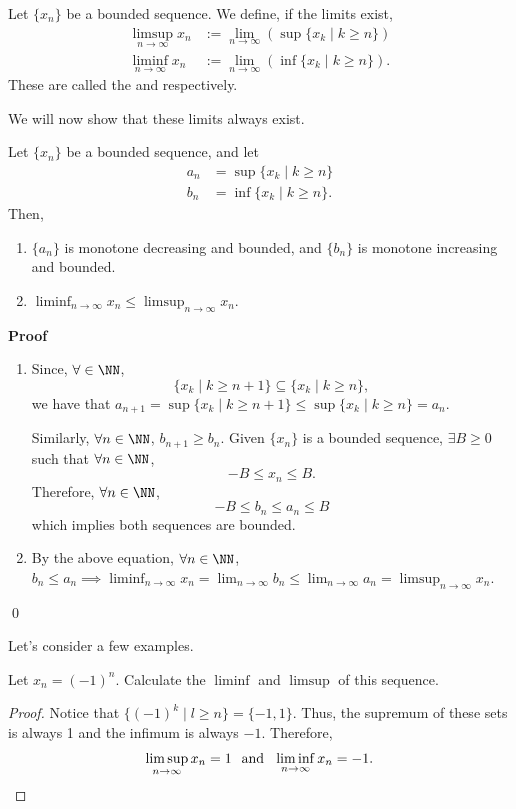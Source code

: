 \begin{definition}
Let $\{x_n\}$ be a bounded sequence. We define, if the limits exist, 
\begin{align*}
\limsup_{n\to \infty} x_n &:= \lim_{n\to \infty}(\sup\{x_k \mid k \geq n\}) \\
\liminf_{n\to \infty} x_n &:= \lim_{n\to \infty}(\inf\{x_k \mid k \geq n\}).
\end{align*}
These are called the  and  respectively.
\end{definition}

We will now show that these limits always exist.
\begin{theorem}
Let $\{x_n\}$ be a bounded sequence, and let 
\begin{align*}
    a_n &= \sup\{x_k \mid k\geq n\} \\
    b_n &= \inf\{x_k \mid k\geq n\}.
\end{align*}
Then, 
\begin{enumerate}
    \item $\{a_n\}$ is monotone decreasing and bounded, and $\{b_n\}$ is monotone increasing and bounded.
    \item $\liminf_{n\to \infty} x_n \leq \limsup_{n\to \infty} x_n$.
\end{enumerate} 
\end{theorem}
\textbf{Proof}
\begin{enumerate}
    \item Since, $\forall \in \NN$, 
    \[
    \{x_k \mid k\geq n+1\} \subseteq \{x_k \mid k \geq n\},
    \]
    we have that $a_{n+1}= \sup\{x_k\mid k\geq n+1\} \leq \sup\{x_k \mid k\geq n\} = a_n$.
    
    Similarly, $\forall n \in \NN$, $b_{n+1} \geq b_n$. Given $\{x_n\}$ is a bounded sequence, $\exists B \geq 0$ such that $\forall n\in \NN$,
    \[
    -B \leq x_n \leq B.
    \]
    Therefore, $\forall n\in \NN$, 
    \[
    -B \leq b_n \leq a_n \leq B
    \]
    which implies both sequences are bounded. 
    \item By the above equation, $\forall n\in \NN$, $b_n \leq a_n \implies \liminf_{n\to \infty} x_n = \lim_{n\to \infty} b_n \leq \lim_{n\to \infty} a_n = \limsup_{n\to \infty} x_n.$
\end{enumerate}
\qed 

\noindent Let's consider a few examples.
\begin{example}
Let $x_n = (-1)^n$. Calculate the $\liminf$ and $\limsup$ of this sequence.
\end{example}
\begin{proof}
Notice that $\{(-1)^k \mid l\geq n\} = \{-1,1\}$. Thus, the supremum of these sets is always 1 and the infimum is always $-1$. Therefore, 
\[
\limsup_{n\to \infty} x_n = 1 \hspace{.25cm} \text{and} \hspace{.25cm} \liminf_{n\to \infty} x_n = -1.
\]
\end{proof}

